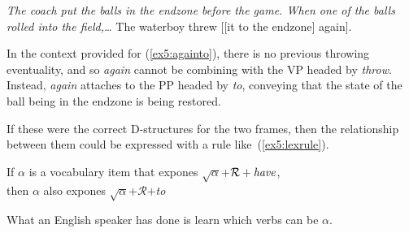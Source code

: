 \begin{exe}
	\raggedright
	\sn \emph{The coach put the balls in the endzone before the game. When one of the balls rolled into the field,\ldots}
	\ex \label{ex5:againto} 
	The waterboy threw [[it to the endzone] again].
\end{exe}
In the context provided for (\ref{ex5:againto}), there is no previous throwing eventuality, and so \emph{again} cannot be combining with the VP headed by \emph{throw}. Instead, \emph{again} attaches to the PP headed by \emph{to}, conveying that the state of the ball being in the endzone is being restored.
\enlargethispage*{\baselineskip}

If these were the correct D-structures for the two frames, then the relationship between them could be expressed with a rule like~(\ref{ex5:lexrule}).
\begin{exe}
	\raggedright
	\ex \label{ex5:lexrule} 
	If $\alpha$ is a vocabulary item that expones $\surd \alpha$+$\mathcal{R}+\emph{have}$,\\ then $\alpha$ also expones $\surd \alpha$+$\mathcal{R}$+\emph{to}
\end{exe}
What an English speaker has done is learn which verbs can be $\alpha$.

